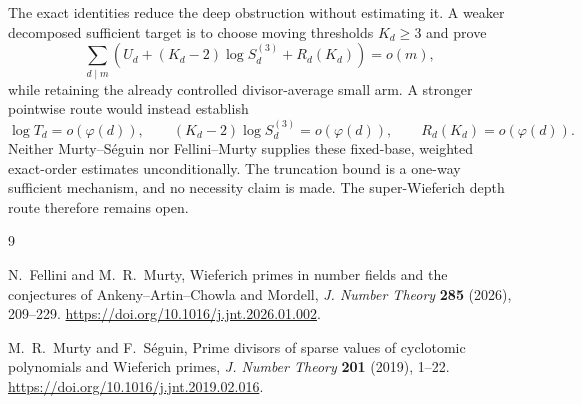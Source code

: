 \documentclass[11pt]{article}
\theoremstyle{remark}
\begin{document}
The exact identities reduce the deep obstruction without estimating it.
A weaker decomposed sufficient target is to choose moving thresholds
$K_d\ge3$ and prove
\begin{equation}
 \sum_{d\mid m}\left(
   U_d+(K_d-2)\log S_d^{(3)}+R_d(K_d)
 \right)=o(m),
 \label{eq:open-gate}
\end{equation}
while retaining the already controlled divisor-average small arm.  A
stronger pointwise route would instead establish
\[
 \log T_d=o(\varphi(d)),\qquad
 (K_d-2)\log S_d^{(3)}=o(\varphi(d)),\qquad
 R_d(K_d)=o(\varphi(d)).
\]
Neither Murty--S\'eguin nor Fellini--Murty supplies these fixed-base,
weighted exact-order estimates unconditionally.  The truncation bound is a
one-way sufficient mechanism, and no necessity claim is made.  The
super-Wieferich depth route therefore remains open.

\begin{thebibliography}{9}
\small

N.~Fellini and M.~R.~Murty,
\newblock Wieferich primes in number fields and the conjectures of
Ankeny--Artin--Chowla and Mordell,
\newblock \emph{J. Number Theory} \textbf{285} (2026), 209--229.
\newblock \url{https://doi.org/10.1016/j.jnt.2026.01.002}.

M.~R.~Murty and F.~S\'eguin,
\newblock Prime divisors of sparse values of cyclotomic polynomials and
Wieferich primes,
\newblock \emph{J. Number Theory} \textbf{201} (2019), 1--22.
\newblock \url{https://doi.org/10.1016/j.jnt.2019.02.016}.

\end{thebibliography}
\end{document}
